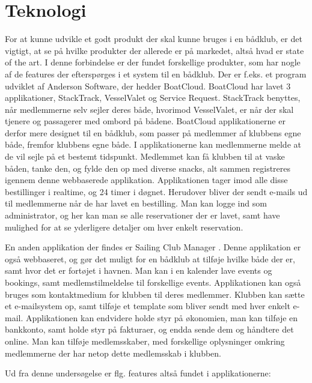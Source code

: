 \chapter{Teknologi}\label{chap:teknologi-analyse}

\cbstart

For at kunne udvikle et godt produkt der skal kunne bruges i en bådklub, er det vigtigt, at se på hvilke
produkter der allerede er på markedet, altså hvad er state of the art. I denne forbindelse er der fundet
forskellige produkter, som har nogle af de features der efterspørges i et system til en bådklub. Der er f.eks.
et program udviklet af Anderson Software, der hedder BoatCloud.\citep{BoatCloud} BoatCloud har lavet 3
applikationer, StackTrack, VesselValet og Service Request. StackTrack benyttes, når medlemmerne selv sejler
deres både, hvorimod VesselValet, er når der skal tjenere og passagerer med ombord på bådene. BoatCloud
applikationerne er derfor mere designet til en bådklub, som passer på medlemmer af klubbens egne både, fremfor
klubbens egne både. I applikationerne kan medlemmerne melde at de vil sejle på et bestemt tidspunkt. Medlemmet
kan få klubben til at vaske båden, tanke den, og fylde den op med diverse snacks, alt sammen registreres
igennem denne webbaserede applikation. Applikationen tager imod alle disse bestillinger i realtime, og 24
timer i døgnet. Herudover bliver der sendt e-mails ud til medlemmerne når de har lavet en bestilling. Man kan
logge ind som administrator, og her kan man se alle reservationer der er lavet, samt have mulighed for at
se yderligere detaljer om hver enkelt reservation.

En anden applikation der findes er Sailing Club Manager \citep{SailClub}. Denne applikation er også
webbaseret, og gør det muligt for en bådklub at tilføje hvilke både der er, samt hvor det er fortøjet i
havnen. Man kan i en kalender lave events og bookings, samt medlemstilmeldelse til forskellige events. Applikationen kan også bruges som kontaktmedium for klubben til deres medlemmer. Klubben kan sætte et
e-mailsystem op, samt tilføje et template som bliver sendt med hver enkelt e-mail. Applikationen kan endvidere
holde styr på økonomien, man kan tilføje en bankkonto, samt  holde styr på fakturaer, og endda sende
dem og håndtere det online. Man kan tilføje medlemsskaber, med forskellige oplysninger omkring medlemmerne der
har netop dette medlemsskab i klubben.

Ud fra denne undersøgelse er flg. features altså fundet i applikationerne:

